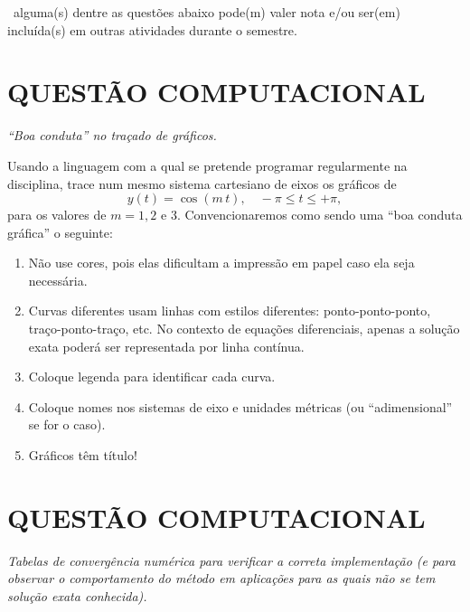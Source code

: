 \documentclass{article}
\begin{document}
\, alguma(s) dentre as questões abaixo pode(m) valer nota e/ou ser(em) incluída(s) em outras atividades durante o semestre.
\mbox{}
\vspace{5mm}

\section{QUESTÃO COMPUTACIONAL}
{\it ``Boa conduta'' no traçado de gráficos.}

\vspace{5mm}

Usando a linguagem com a qual se pretende programar regularmente na disciplina, trace num mesmo sistema cartesiano de eixos  os gráficos de 
\[y(t)=\cos(m\,t),\quad -\pi\le t\le +\pi,\]
para os valores de $m=1,2$ e 3. Convencionaremos como sendo uma ``boa conduta gráfica'' o seguinte:
\begin{enumerate}
 \item Não use cores, pois elas dificultam a impressão em papel caso ela seja necessária.
 \item Curvas diferentes usam linhas com estilos diferentes: ponto-ponto-ponto, traço-ponto-traço, etc. No contexto de equações diferenciais, apenas a solução exata poderá ser representada por linha contínua. 
 \item Coloque legenda para identificar cada curva.
 \item Coloque nomes nos sistemas de eixo e unidades métricas (ou ``adimensional'' se for o caso).
 \item Gráficos têm título!
\end{enumerate}

\section{QUESTÃO COMPUTACIONAL}
{\it Tabelas de convergência numérica para verificar a correta implementação (e para observar o comportamento do método em aplicações para as quais não se tem solução exata conhecida).}

\vspace{5mm}
\end{document}
